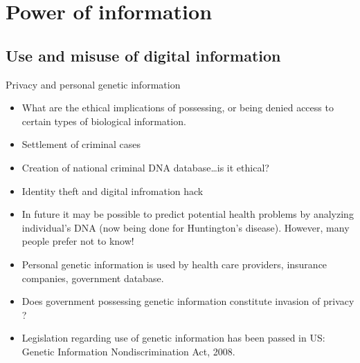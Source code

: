 \documentclass[ignorenonframetext,aspectratio=169]{beamer}
\providecommand{\tightlist}{%
  \setlength{\itemsep}{0pt}\setlength{\parskip}{0pt}}
\begin{document}
\hypertarget{power-of-information}{%
\section{Power of information}\label{power-of-information}}

\hypertarget{use-and-misuse-of-digital-information}{%
\subsection{Use and misuse of digital
information}\label{use-and-misuse-of-digital-information}}

\begin{frame}{Privacy and personal genetic information}
\protect\hypertarget{privacy-and-personal-genetic-information}{}

\begin{itemize}
\tightlist
\item
  What are the ethical implications of possessing, or being denied
  access to certain types of biological information.
\item
  Settlement of criminal cases
\item
  Creation of national criminal DNA database\ldots{}is it ethical?
\item
  Identity theft and digital infromation hack
\item
  In future it may be possible to predict potential health problems by
  analyzing individual's DNA (now being done for Huntington's disease).
  However, many people prefer not to know!
\item
  Personal genetic information is used by health care providers,
  insurance companies, government database.
\item
  Does government possessing genetic information constitute invasion of
  privacy ?
\item
  Legislation regarding use of genetic information has been passed in
  US: Genetic Information Nondiscrimination Act, 2008.
\end{itemize}

\end{frame}
\end{document}
